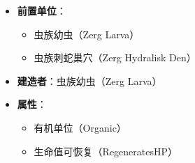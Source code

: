 \begin{tcolorbox}[colback=white, colframe=black!60!white, title=Zerg\_Hydralisk(), arc=0mm]
\begin{itemize}
        \item \textbf{前置单位}：
            \begin{itemize}
                \item 虫族幼虫（Zerg Larva）
                \item 虫族刺蛇巢穴（Zerg Hydralisk Den）
            \end{itemize}
        \item \textbf{建造者}：虫族幼虫（Zerg Larva）
        \item \textbf{属性}：
            \begin{itemize}
                \item 有机单位（Organic）
                \item 生命值可恢复（RegeneratesHP）
            \end{itemize}
    \end{itemize}
\end{tcolorbox}

